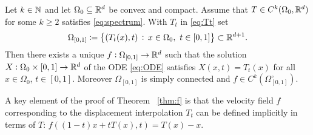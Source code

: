 \begin{theorem}\label{thm:f}
  Let $k\in\mathbb{N}$ and let $\Omega_0\subseteq\mathbb{R}^d$ be convex and
    compact. Assume that $T\in C^k(\Omega_0,\mathbb{R}^d)$ for some $k\geq 2$
    satisfies \eqref{eq:spectrum}.
    With $T_t$ in \eqref{eq:Tt} set
    \begin{equation}\label{eq:Omega}
      \Omega_{[0,1]}  \coloneqq \left\{(T_t(x),t)\, :\,x\in\Omega_0,~t\in [0,1]\right\}\subset\mathbb{R}^{d+1}.
    \end{equation}
    Then there exists a unique $f:\Omega_{[0,1]}\to\mathbb{R}^d$ such that the
    solution $X:\Omega_0\times [0,1]\to\mathbb{R}^d$ of the ODE \eqref{eq:ODE}
    satisfies $X(x,t)=T_t(x)$ for all $x\in\Omega_0$, $t\in [0,1]$.
    Moreover $\Omega_{[0,1]}$ is simply connected and
    $f\in C^k(\Omega_{[0,1]}^\circ)$.
\end{theorem}


A key element of the proof of Theorem ~\ref{thm:f} is that the velocity field $f$ corresponding to the displacement interpolation $T_t$ can be defined implicitly in terms of $T$: $f\left ( (1-t)x + t T(x), t \right ) = T(x) - x$.

